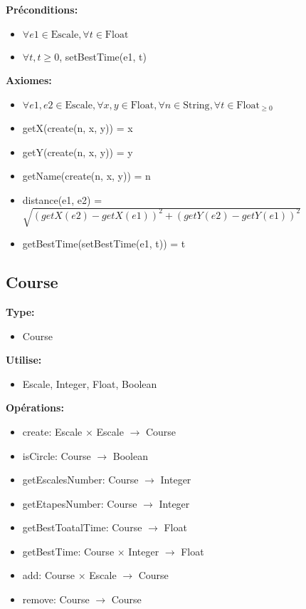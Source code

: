 \documentclass[a4paper, 11pt, oneside]{article}
\begin{document}
\textbf{Préconditions:}
\begin{itemize}
    \item[] $\forall e1 \in \text{Escale}, \forall t \in \text{Float}$
    \item[] $\forall t, t \geq 0$, setBestTime(e1, t)
\end{itemize}

\textbf{Axiomes:}
\begin{itemize}
    \item[] $\forall e1, e2 \in \text{Escale}, \forall x, y \in \text{Float}, \forall n \in \text{String}, \forall t \in \text{Float}_{\geq0}$
    \item[] getX(create(n, x, y)) = x
    \item[] getY(create(n, x, y)) = y
    \item[] getName(create(n, x, y)) = n
    \item[] distance(e1, e2) = $\sqrt{(getX(e2) - getX(e1))^2 + (getY(e2) - getY(e1))^2}$
    \item[] getBestTime(setBestTime(e1, t)) = t
\end{itemize}

\subsection{Course}

\textbf{Type:}
\begin{itemize}
    \item[] Course
\end{itemize}

\textbf{Utilise:}
\begin{itemize}
    \item[] Escale, Integer, Float, Boolean
\end{itemize}

\textbf{Opérations:}
\begin{itemize}
    \item[] create: Escale $\times$ Escale $\to$ Course
    \item[] isCircle: Course $\to$ Boolean
    \item[] getEscalesNumber: Course $\to$ Integer
    \item[] getEtapesNumber: Course $\to$ Integer
    \item[] getBestToatalTime: Course $\to$ Float
    \item[] getBestTime: Course $\times$ Integer $\to$ Float
    \item[] add: Course $\times$ Escale $\to$ Course
    \item[] remove: Course $\to$ Course
\end{itemize}
\end{document}
